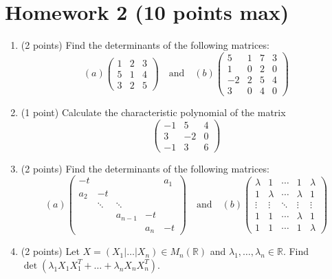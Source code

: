 \documentclass{article}
\begin{document}
\section*{Homework 2 (10 points max)}

\begin{enumerate}
  \item (2 points) Find the determinants of the following matrices:
  \[
  (a) \begin{pmatrix}
  1 & 2 & 3 \\
  5 & 1 & 4 \\
  3 & 2 & 5
  \end{pmatrix}
  \quad \text{and} \quad
  (b) \begin{pmatrix}
  5 & 1 & 7 & 3 \\
  1 & 0 & 2 & 0 \\
  -2 & 2 & 5 & 4 \\
  3 & 0 & 4 & 0
  \end{pmatrix}
  \]

  \item (1 point) Calculate the characteristic polynomial of the matrix
  \[
  \begin{pmatrix}
  -1 & 5 & 4 \\
  3 & -2 & 0 \\
  -1 & 3 & 6
  \end{pmatrix}
  \]

  \item (2 points) Find the determinants of the following matrices:
  \[
  (a) \begin{pmatrix}
  -t  &    &   &  & a_1 \\
  a_2 & -t &   &  &   \\
      & \ddots & \ddots & & \\
      &    & a_{n-1} & -t & \\
      &    &  & a_n & -t
  \end{pmatrix}
  \quad \text{and} \quad
  (b) \begin{pmatrix}
  \lambda & 1 & \cdots & 1 & \lambda \\
  1 & \lambda & \cdots & \lambda & 1 \\
  \vdots & \vdots & \ddots & \vdots & \vdots \\
  1 & 1 & \cdots & \lambda & 1 \\
  1 & 1 & \cdots & 1 & \lambda
  \end{pmatrix}
  \]

  \item (2 points) Let $X = (X_1 | \dots | X_n) \in M_n(\mathbb{R})$ and $\lambda_1, \dots, \lambda_n \in \mathbb{R}$. Find $\det(\lambda_1 X_1 X_1^T + \dots + \lambda_n X_n X_n^T)$.


\end{enumerate}
\end{document}
